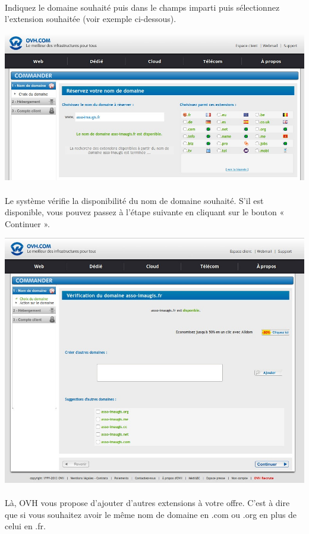 \documentclass[10pt,a4paper]{article}
\begin{document}
\paragraph{}Indiquez le domaine souhaité puis dans le champs imparti puis sélectionnez l'extension souhaitée (voir exemple ci-dessous).
\begin{center}
\includegraphics[scale=0.3]{img/0274.png}
\end{center}
\newpage
\paragraph{}Le système vérifie la disponibilité du nom de domaine souhaité. S'il est disponible, vous pouvez passez à l'étape suivante en cliquant sur le bouton « Continuer ».
\begin{center}
\includegraphics[scale=0.3]{img/0275.png}
\end{center}
\paragraph{}Là, OVH vous propose d'ajouter d'autres extensions à votre offre. C'est à dire que si vous souhaitez avoir le même nom de domaine en .com ou .org en plus de celui en .fr.
\end{document}
